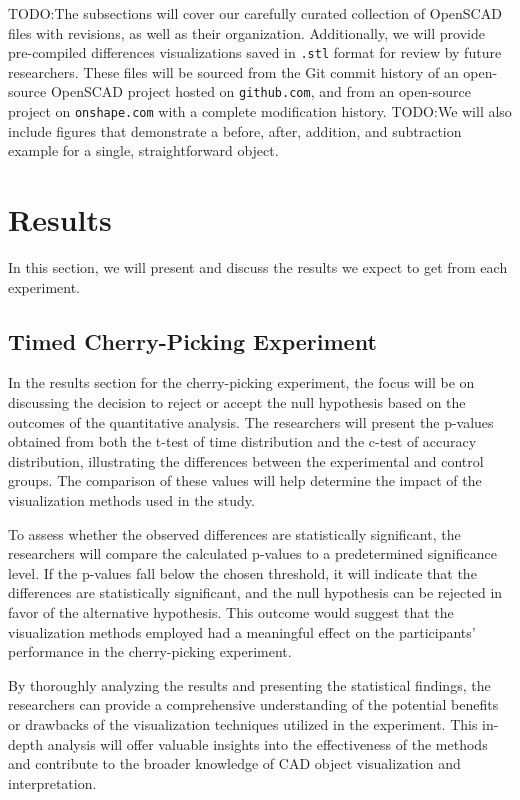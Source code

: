 \documentclass[sigconf,authorversion,nonacm]{acmart}
\begin{document}
TODO:The subsections will cover our carefully curated collection of OpenSCAD files with revisions, as well as their organization. Additionally, we will provide pre-compiled differences visualizations saved in \texttt{.stl} format for review by future researchers. These files will be sourced from the Git commit history of an open-source OpenSCAD project hosted on \texttt{github.com}, and from an open-source project on \texttt{onshape.com} with a complete modification history.
TODO:We will also include figures that demonstrate a before, after, addition, and subtraction example for a single, straightforward object.

\section{Results}

In this section, we will present and discuss the results we expect to get from each experiment.

\subsection{Timed Cherry-Picking Experiment}

In the results section for the cherry-picking experiment, the focus will be on discussing the decision to reject or accept the null hypothesis based on the outcomes of the quantitative analysis. 
The researchers will present the p-values obtained from both the t-test of time distribution and the c-test of accuracy distribution, illustrating the differences between the experimental and control groups. 
The comparison of these values will help determine the impact of the visualization methods used in the study.

To assess whether the observed differences are statistically significant, the researchers will compare the calculated p-values to a predetermined significance level.
If the p-values fall below the chosen threshold, it will indicate that the differences are statistically significant, and the null hypothesis can be rejected in favor of the alternative hypothesis. 
This outcome would suggest that the visualization methods employed had a meaningful effect on the participants' performance in the cherry-picking experiment.

By thoroughly analyzing the results and presenting the statistical findings, the researchers can provide a comprehensive understanding of the potential benefits or drawbacks of the visualization techniques utilized in the experiment. 
This in-depth analysis will offer valuable insights into the effectiveness of the methods and contribute to the broader knowledge of CAD object visualization and interpretation.
\end{document}
